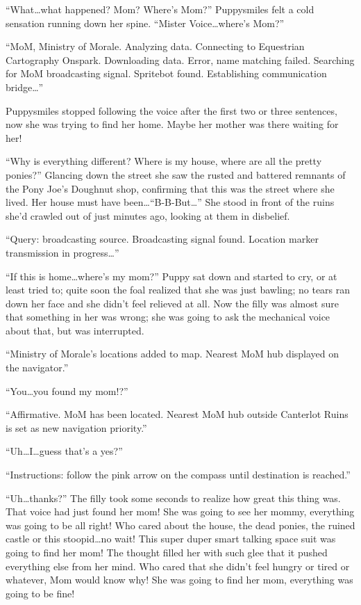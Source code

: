 ``What\dots what happened? Mom? Where's Mom?'' Puppysmiles felt a cold sensation running down her spine. ``Mister Voice\dots where's Mom?''

``{\mt MoM, Ministry of Morale. Analyzing data. Connecting to Equestrian Cartography Onspark. Downloading data. Error, name matching failed. Searching for MoM broadcasting signal. Spritebot found. Establishing communication bridge\dots }''

Puppysmiles stopped following the voice after the first two or three sentences, now she was trying to find her home. Maybe her mother was there waiting for her!

``Why is everything different? Where is my house, where are all the pretty ponies?'' Glancing down the street she saw the rusted and battered remnants of the Pony Joe's Doughnut shop, confirming that this was the street where she lived. Her house must have been\dots ``B-B-But\dots'' She stood in front of the ruins she'd crawled out of just minutes ago, looking at them in disbelief.

``{\mt Query: broadcasting source. Broadcasting signal found. Location marker transmission in progress\dots}''

``If this is home\dots where's my mom?'' Puppy sat down and started to cry, or at least tried to; quite soon the foal realized that she was just bawling; no tears ran down her face and she didn't feel relieved at all. Now the filly was almost sure that something in her was wrong; she was going to ask the mechanical voice about that, but was interrupted.

``{\mt Ministry of Morale's locations added to map. Nearest MoM hub displayed on the navigator.}''

``You\dots you found my mom!?''

``{\mt Affirmative. MoM has been located. Nearest MoM hub outside Canterlot Ruins is set as new navigation priority.}''

``Uh\dots I\dots guess that's a yes?''

``{\mt Instructions: follow the pink arrow on the compass until destination is reached.}''

``Uh\dots thanks?'' The filly took some seconds to realize how great this thing was. That voice had just found her mom! She was going to see her mommy, everything was going to be all right! Who cared about the house, the dead ponies, the ruined castle or this stoopid\dots no wait! This super duper smart talking space suit was going to find her mom! The thought filled her with such glee that it pushed everything else from her mind. Who cared that she didn't feel hungry or tired or whatever, Mom would know why! She was going to find her mom, everything was going to be fine!

